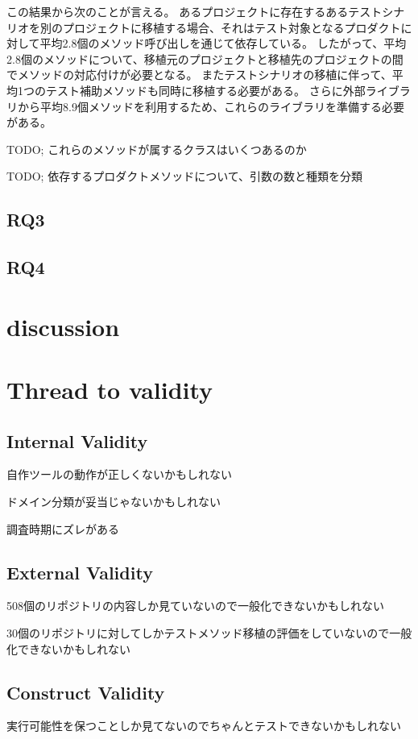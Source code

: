 \documentclass[conference]{IEEEtran}
\begin{document}
この結果から次のことが言える。
あるプロジェクトに存在するあるテストシナリオを別のプロジェクトに移植する場合、それはテスト対象となるプロダクトに対して平均2.8個のメソッド呼び出しを通じて依存している。
したがって、平均2.8個のメソッドについて、移植元のプロジェクトと移植先のプロジェクトの間でメソッドの対応付けが必要となる。
またテストシナリオの移植に伴って、平均1つのテスト補助メソッドも同時に移植する必要がある。
さらに外部ライブラリから平均8.9個メソッドを利用するため、これらのライブラリを準備する必要がある。

TODO; これらのメソッドが属するクラスはいくつあるのか

TODO; 依存するプロダクトメソッドについて、引数の数と種類を分類



\subsection{RQ3}

\subsection{RQ4}

\section{discussion}

\section{Thread to validity}
\subsection{Internal Validity}
自作ツールの動作が正しくないかもしれない

ドメイン分類が妥当じゃないかもしれない

調査時期にズレがある

\subsection{External Validity}
508個のリポジトリの内容しか見ていないので一般化できないかもしれない

30個のリポジトリに対してしかテストメソッド移植の評価をしていないので一般化できないかもしれない

\subsection{Construct Validity}
実行可能性を保つことしか見てないのでちゃんとテストできないかもしれない
\end{document}
